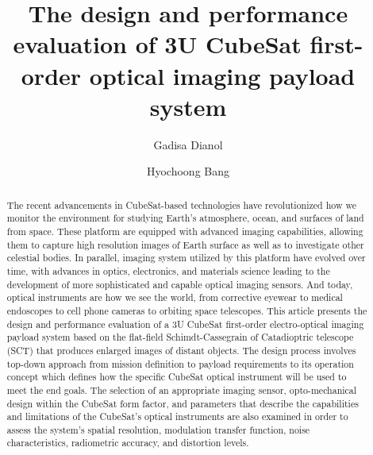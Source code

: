\documentclass[final,5p,times,sort&compress,twocolumn]{elsarticle}
\begin{document}
\begin{frontmatter}

\title{The design and performance evaluation of 3U CubeSat first-order optical imaging payload system}

\author[1]{Gadisa Dianol}
\author[1]{Hyochoong Bang}

\begin{abstract}
The recent advancements in CubeSat-based technologies have revolutionized how we monitor the environment for studying Earth's atmosphere, ocean, and surfaces of land from space. These platform are equipped with advanced imaging capabilities, allowing them to capture high resolution images of Earth surface as well as to investigate other celestial bodies.  In parallel, imaging system utilized by this platform have evolved over time, with advances in optics, electronics, and materials science leading to the development of more sophisticated and capable  optical imaging sensors. And today, optical instruments are how we see the world, from corrective eyewear to medical endoscopes to cell phone cameras to orbiting space telescopes. This article presents the design and performance evaluation of a 3U CubeSat first-order electro-optical imaging payload system based on the flat-field Schimdt-Cassegrain of Catadioptric telescope (SCT) that produces enlarged images of distant objects. The design process involves top-down approach from mission definition to payload requirements to its operation concept which defines how the specific CubeSat optical instrument will be used to meet the end goals. The selection of an appropriate imaging sensor, opto-mechanical design within the CubeSat form factor, and parameters that describe the capabilities and limitations of the CubeSat's optical instruments are also examined in order to assess the system's spatial resolution, modulation transfer function, noise characteristics, radiometric accuracy, and distortion levels.
\end{abstract}


\end{frontmatter}
\end{document}
